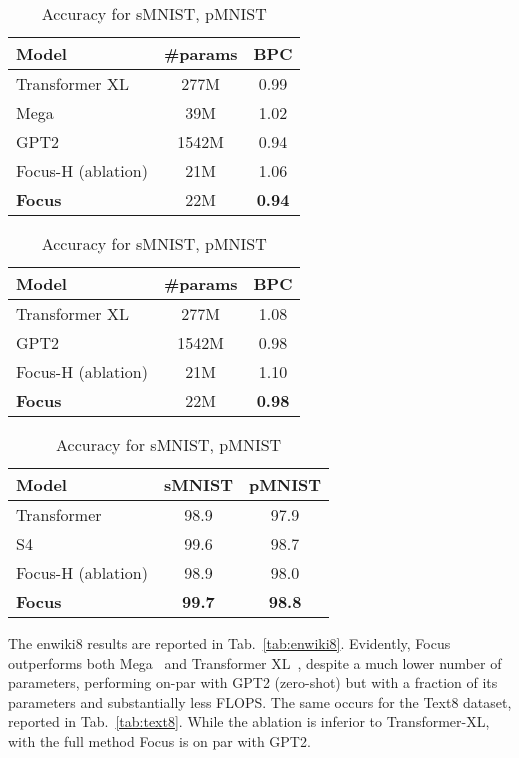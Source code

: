 \documentclass[11pt]{article}
\begin{document}
\begin{table}[t]
\centering
\caption{BPC for enwiki8 dataset.}
\begin{tabular}{@{}l@{~}c@{~}c@{}}
\toprule
Model & \#params &  BPC\\
\midrule
Transformer XL \cite{dai2019transformer} & 277M & 0.99\\
Mega \cite{ma2022mega} & 39M & 1.02\\
GPT2 \cite{Radford2019LanguageMA} & 1542M & 0.94\\
Focus-H (ablation)  & 21M & 1.06\\
\textbf{Focus}  & 22M & \textbf{0.94}\\
\bottomrule
\end{tabular}
\label{tab:enwiki8}
\smallskip
\smallskip
\smallskip


\centering
\caption{BPC for text8 dataset.}
\begin{tabular}{@{}l@{~}c@{~}c@{}}
\toprule
Model & \#params &  BPC\\
\midrule
Transformer XL \cite{dai2019transformer} & 277M & 1.08\\
GPT2 \cite{Radford2019LanguageMA} & 1542M & 0.98\\
Focus-H (ablation)  & 21M & 1.10\\
\textbf{Focus}  & 22M & \textbf{0.98}\\
\bottomrule
\end{tabular}
\label{tab:text8}
\smallskip
\smallskip
\smallskip


\caption{Accuracy for sMNIST, pMNIST}
\begin{tabular}{@{}l@{~}c@{~}c@{}}
\toprule
Model & sMNIST &  pMNIST\\
\midrule
Transformer& 98.9 & 97.9\\
S4 \cite{gu2021efficiently} & 99.6 & 98.7\\
Focus-H (ablation)  & 98.9 & 98.0\\
\textbf{Focus}  & \textbf{99.7} & \textbf{98.8}\\
\bottomrule
\end{tabular}
\label{tab:snpMNIST}
\end{table}


The enwiki8 results are reported in Tab.~\ref{tab:enwiki8}. Evidently, Focus outperforms both Mega~\cite{ma2022mega} and Transformer XL~\cite{dai2019transformer}, despite a much lower number of parameters, performing on-par with GPT2\cite{Radford2019LanguageMA} (zero-shot) but with a fraction of its parameters and substantially less FLOPS. 
The same occurs for the Text8 dataset, reported in Tab.~\ref{tab:text8}. While the ablation is inferior to Transformer-XL, with the full method Focus is on par with GPT2.
\end{document}
